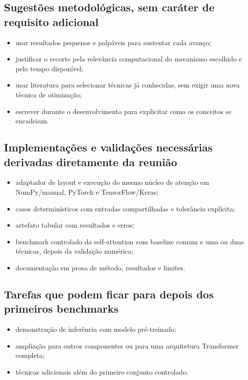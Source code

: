 \subsection{Sugestões metodológicas, sem caráter de requisito adicional}


\begin{itemize}
\item usar resultados pequenos e palpáveis para sustentar cada avanço;
\item justificar o recorte pela relevância computacional do mecanismo escolhido e
pelo tempo disponível;
\item usar literatura para selecionar técnicas já conhecidas, sem exigir uma nova
técnica de otimização;
\item escrever durante o desenvolvimento para explicitar como os conceitos se
encadeiam.
\end{itemize}


\subsection{Implementações e validações necessárias derivadas diretamente da reunião}


\begin{itemize}
\item adaptador de layout e execução do mesmo núcleo de atenção em
NumPy/manual, PyTorch e TensorFlow/Keras;
\item casos determinísticos com entradas compartilhadas e tolerância explícita;
\item artefato tabular com resultados e erros;
\item benchmark controlado da self-attention com baseline comum e uma ou duas
técnicas, depois da validação numérica;
\item documentação em prosa de método, resultados e limites.
\end{itemize}


\subsection{Tarefas que podem ficar para depois dos primeiros benchmarks}


\begin{itemize}
\item demonstração de inferência com modelo pré-treinado;
\item ampliação para outros componentes ou para uma arquitetura Transformer
completa;
\item técnicas adicionais além do primeiro conjunto controlado.
\end{itemize}


